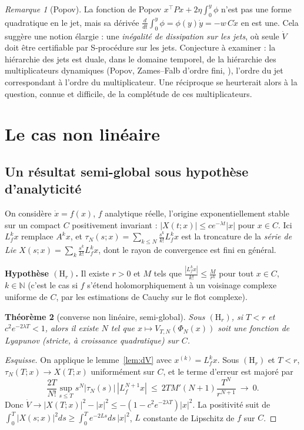 \documentclass[11pt,a4paper]{article}
\newtheorem{theorem}{Théorème}[section]
\theoremstyle{definition}
\theoremstyle{remark}
\newtheorem{remark}[theorem]{Remarque}
\newcommand{\N}{\mathbb{N}}
\newcommand{\tr}{^{\top}}
\begin{document}
\begin{remark}[Popov]
La fonction de Popov $x\tr Px + 2\eta\int_0^y\phi$ n'est pas une forme quadratique en le jet, mais sa dérivée $\frac{d}{dt}\int_0^y\phi = \phi(y)\dot y = -w\,C\dot x$ en est une. Cela suggère une notion élargie : une \emph{inégalité de dissipation sur les jets}, où seule $\dot V$ doit être certifiable par S-procédure sur les jets. Conjecture à examiner : la hiérarchie des jets est duale, dans le domaine temporel, de la hiérarchie des multiplicateurs dynamiques (Popov, Zames–Falb d'ordre fini, \cite{CHT}), l'ordre du jet correspondant à l'ordre du multiplicateur. Une réciproque se heurterait alors à la question, connue et difficile, de la complétude de ces multiplicateurs.
\end{remark}

\section{Le cas non linéaire}

\subsection{Un résultat semi-global sous hypothèse d'analyticité}
On considère $\dot x = f(x)$, $f$ analytique réelle, l'origine exponentiellement stable sur un compact $C$ positivement invariant : $|X(t;x)|\le ce^{-\lambda t}|x|$ pour $x\in C$. Ici $L_f^kx$ remplace $A^kx$, et $\tau_N(s;x) = \sum_{k\le N}\frac{s^k}{k!}L_f^kx$ est la troncature de la \emph{série de Lie} $X(s;x) = \sum_k\frac{s^k}{k!}L_f^kx$, dont le rayon de convergence est fini en général.

\smallskip
\noindent\textbf{Hypothèse $(\mathrm H_r)$.} Il existe $r>0$ et $M$ tels que $\frac{|L_f^kx|}{k!}\le\frac{M}{r^k}$ pour tout $x\in C$, $k\in\N$ (c'est le cas si $f$ s'étend holomorphiquement à un voisinage complexe uniforme de $C$, par les estimations de Cauchy sur le flot complexe).

\begin{theorem}[converse non linéaire, semi-global]\label{thm:NL}
Sous $(\mathrm H_r)$, si $T<r$ et $c^2e^{-2\lambda T}<1$, alors il existe $N$ tel que $x\mapsto V_{T,N}(\Phi_N(x))$ soit une fonction de Lyapunov (stricte, à croissance quadratique) sur $C$.
\end{theorem}
\begin{proof}[Esquisse]
On applique le lemme~\ref{lem:dV} avec $x^{(k)} = L_f^kx$. Sous $(\mathrm H_r)$ et $T<r$, $\tau_N(T;x)\to X(T;x)$ uniformément sur $C$, et le terme d'erreur est majoré par
\[\frac{2T}{N!}\sup_{s\le T}s^N|\tau_N(s)|\,|L_f^{N+1}x|\ \le\ 2TM'(N+1)\frac{T^N}{r^{N+1}}\ \to\ 0 .\] Donc $\dot V\to |X(T;x)|^2-|x|^2\le-(1-c^2e^{-2\lambda T})|x|^2$. La positivité suit de $\int_0^T|X(s;x)|^2ds\ge\int_0^Te^{-2Ls}ds\,|x|^2$, $L$ constante de Lipschitz de $f$ sur $C$.
\end{proof}
\end{document}
